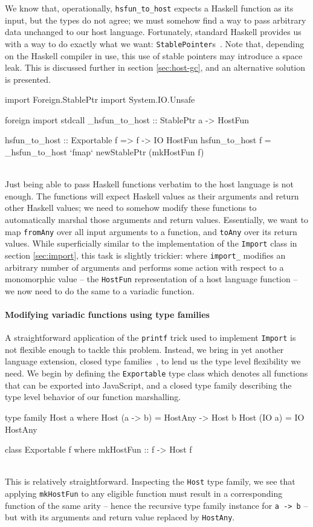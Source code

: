 \documentclass[preprint]{sigplanconf}
\begin{document}
We know that, operationally, \lstinline!hsfun_to_host! expects a Haskell
function as its input, but the types do not agree; we must somehow find a way
to pass arbitrary data unchanged to our host language.
Fortunately, standard Haskell provides us with a way to do exactly what we want:
\lstinline!StablePointer!s\ \cite{stableptr}. Note that, depending on the
Haskell compiler in use, this use of stable pointers may introduce a space
leak. This is discussed further in section \ref{sec:host-gc}, and an
alternative solution is presented.\\
\begin{code}
import Foreign.StablePtr
import System.IO.Unsafe

foreign import stdcall
  _hsfun_to_host :: StablePtr a -> HostFun

hsfun_to_host :: Exportable f => f -> IO HostFun
hsfun_to_host f =
  _hsfun_to_host `fmap` newStablePtr (mkHostFun f)
\end{code}\\
Just being able to pass Haskell functions verbatim to the host language is not
enough. The functions will expect Haskell values as their arguments and return
other Haskell values; we need to somehow modify these functions to
automatically marshal those arguments and return values.
Essentially, we want to map
\lstinline!fromAny! over all input arguments to a function, and
\lstinline!toAny! over its return values.
While superficially similar to the implementation of the \lstinline!Import!
class in section \ref{sec:import}, this task is slightly trickier:
where \lstinline!import_! modifies an arbitrary number of arguments and
performs some action with respect to a monomorphic value -- the
\lstinline!HostFun! representation of a host language function -- we now need
to do the same to a variadic function.

\paragraph{Modifying variadic functions using type families}
A straightforward application of the \lstinline!printf! trick used to
implement \lstinline!Import! is not flexible
enough to tackle this problem. Instead, we bring in yet another language
extension, closed type families\ \cite{closedtypefamilies}, to lend us the type
level flexibility we need. We begin by defining the \lstinline!Exportable!
type class which denotes all functions that can be exported into JavaScript,
and a closed type family describing the type level behavior of our function
marshalling.\\
\begin{code}
type family Host a where
  Host (a -> b) = HostAny -> Host b
  Host (IO a)   = IO HostAny

class Exportable f where
  mkHostFun :: f -> Host f
\end{code}\\
This is relatively straightforward. Inspecting the \lstinline!Host! type
family, we see that applying \lstinline!mkHostFun! to any eligible function
must result in a corresponding function of the same arity -- hence the
recursive type family instance for \lstinline!a -> b! -- but with its
arguments and return value replaced by \lstinline!HostAny!.
\end{document}
